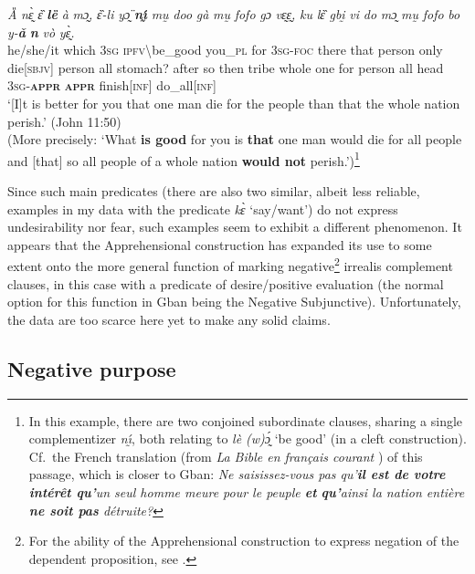 \documentclass[output=paper,colorlinks,citecolor=brown
]{langscibook}
\begin{document}
\ea \label{ex:Fed54}
\gll \textit{Ȁ} \textit{nɛ̰̀} \textit{ɛ̏} \textit{\textbf{lȅ {\OO}}} \textit{à} \textit{mɔ̰,} \textit{ɛ̏-li} \textit{yɔ̰̈} \textit{\textbf{nı̰́}} \textit{mṵ} \textit{doo} \textit{gà} \textit{mṵ} \textit{fofo} \textit{gɔ} \textit{vɛ̰ɛ̰,} \textit{ku} \textit{lɛ̏} \textit{gbḭ} \textit{vi} \textit{do} \textit{mɔ̰} \textit{mṵ} \textit{fofo} \textit{bo} \textit{y-\textbf{ǎ}} \textit{\textbf{n{\ù}}} \textit{vò} \textit{yɛ̰̀.} \\
he/she/it which \textsc{3sg} \textsc{ipfv\backslash}be\_good you\_\textsc{pl} for \textsc{3sg-foc} there that person only die[\textsc{sbjv}] person all stomach? after so then tribe whole one for person all head \textsc{3sg-\textbf{appr}} \textsc{\textbf{appr}} finish[\textsc{inf}] do\_all[\textsc{inf}] \\
\glt `[I]t is better for you that one man die for the people than that the whole nation perish.' (John 11:50) \\
(More precisely: `What \textbf{is good} for you is \textbf{that} one man would die for all people and [that] so all people of a whole nation \textbf{would not} perish.')\footnote{In this example, there are two conjoined subordinate clauses, sharing a single complementizer \textit{nı̰́}, both relating to \textit{lè (w)ɔ̰́} `be good' (in a cleft construction). Cf.\ the French translation (from \textit{La Bible en français courant} \citep{BFC}) of this passage, which is closer to Gban: \textit{Ne saisissez-vous pas qu'\textbf{il est de votre intérêt qu'}un seul homme meure pour le peuple \textbf{et} \textbf{qu'}ainsi la nation entière \textbf{ne soit pas} détruite?}}
\z


 Since such main predicates (there are also two similar, albeit less reliable, examples in my data with the predicate \textit{kɛ̀} `say\slash want') do not express undesirability nor fear, such examples seem to exhibit a different phenomenon. It appears that the Apprehensional construction has expanded its use to some extent onto the more general function of marking negative\footnote{For the ability of the Apprehensional construction to express negation of the dependent proposition, see .} irrealis complement clauses, in this case with a predicate of desire\slash positive evaluation (the normal option for this function in Gban being the Negative Subjunctive). Unfortunately, the data are too scarce here yet to make any solid claims.


\subsection{Negative purpose}
\label{subsec:negativepurpose}
\end{document}
